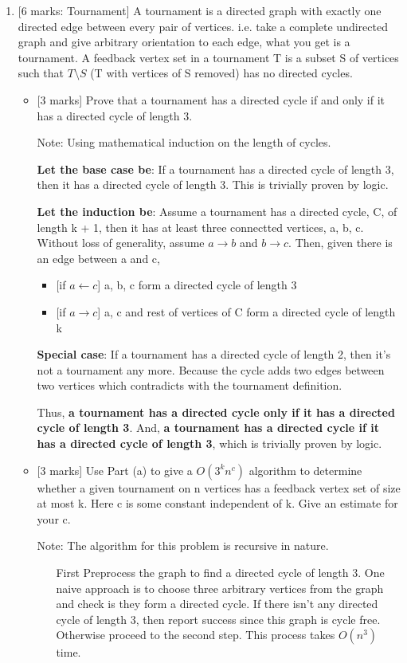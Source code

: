 \documentclass[12pt]{article}
\begin{document}
\begin{enumerate}
\medskip

\item{} [6 marks: Tournament]
A tournament is a directed graph with exactly one directed edge between every pair of vertices. i.e. take a complete undirected graph and give arbitrary orientation to each edge, what you get is a tournament. A feedback vertex set in a tournament T is a subset S of vertices such that $T \setminus S$ (T with vertices of S removed) has no directed cycles.

\begin{itemize}
\item{}[3 marks]
Prove that a tournament has a directed cycle if and only if it has a directed cycle of length 3.

Note: Using mathematical induction on the length of cycles.

\textbf{Let the base case be}: If a tournament has a directed cycle of length 3, then it has a directed cycle of length 3. This is trivially proven by logic.

\textbf{Let the induction be}: Assume a tournament has a directed cycle, C, of length k + 1, then it has at least three connectted vertices, a, b, c. Without loss of generality, assume $a \to b$ and $b \to c$. Then, given there is an edge between a and c,
\begin{itemize}
\item{}[if $a \gets c$]
a, b, c form a directed cycle of length 3

\item{}[if $a \to c$]
a, c and rest of vertices of C form a directed cycle of length k
\end{itemize}

\textbf{Special case}: If a tournament has a directed cycle of length 2, then it's not a tournament any more. Because the cycle adds two edges between two vertices which contradicts with the tournament definition.

Thus, \textbf{a tournament has a directed cycle only if it has a directed cycle of length 3}. And, \textbf{a tournament has a directed cycle if it has a directed cycle of length 3}, which is trivially proven by logic.

\item{}[3 marks]
Use Part (a) to give a $O(3^{k}n^{c})$ algorithm to determine whether a given tournament on n vertices has a feedback vertex set of size at most k. Here c is some constant independent of k. Give an estimate for your c.

Note: The algorithm for this problem is recursive in nature.
\begin{itemize}
\item[First]
Preprocess the graph to find a directed cycle of length 3. One naive approach is to choose three arbitrary vertices from the graph and check is they form a directed cycle. If there isn't any directed cycle of length 3, then report success since this graph is cycle free. Otherwise proceed to the second step. This process takes $O(n^{3})$ time.


\end{itemize}
\end{itemize}
\end{enumerate}
\end{document}
